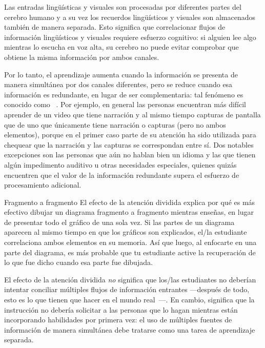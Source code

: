 Las entradas lingüísticas y visuales son procesadas por diferentes partes del cerebro humano
y a su vez los recuerdos lingüísticos y visuales son almacenados también de manera separada.
Esto significa que correlacionar flujos de información lingüísticos y visuales requiere esfuerzo cognitivo:
si alguien lee algo mientras lo escucha en voz alta,
su cerebro no puede evitar comprobar que obtiene la misma información por ambos canales.

Por lo tanto, el aprendizaje aumenta cuando la información se presenta de manera simultánea por dos canales diferentes,
pero se reduce cuando esa información es redundante, en lugar de ser complementaria:
tal fenómeno es conocido como ~\cite{Maye2003}.
Por ejemplo, en general las personas encuentran más difícil aprender de un video que tiene narración y
al mismo tiempo capturas de pantalla que de uno que únicamente tiene narración o capturas (pero no ambos elementos),
porque en el primer caso parte de su atención ha sido utilizada para chequear que la narración  
y las capturas se correspondan entre sí. Dos notables excepciones 
son las personas que aún no hablan bien un idioma y las que tienen algún impedimento auditivo u
otras necesidades especiales, quienes quizás encuentren que el valor de la información redundante
supera el esfuerzo de procesamiento adicional.

\begin{aside}{Fragmento a fragmento}
  El efecto de la atención dividida explica por qué es más efectivo dibujar un diagrama
  fragmento a fragmento mientras enseñas, en lugar de presentar todo el gráfico de una sola vez.
  Si las partes de un diagrama aparecen al mismo tiempo en que los gráficos son explicados,
  el/la estudiante correlaciona ambos elementos en su memoria.
  Así que luego, al enfocarte en una parte del diagrama, es más probable que tu estudiante active la recuperación
  de lo que fue dicho cuando esa parte fue dibujada.
\end{aside}

El efecto de la atención dividida \emph{no} significa
que los/las estudiantes no deberían intentar conciliar múltiples flujos de información entrantes —después de todo, esto es lo que tienen que hacer en el mundo real~\cite{Atki2000}—.
En cambio, significa que la instrucción no debería solicitar a las personas
que lo hagan mientras están incorporando habilidades por primera vez:
el uso de múltiples fuentes  de información de manera simultánea debe tratarse como una tarea de aprendizaje separada.

